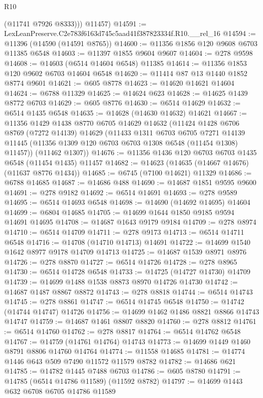 \begin{lexlean}{R10}
\begin{coremodule}
          (@11741 @7926 @8333)))
      @11457)
@14591 := LexLeanPreserve.C2e783f6163d745c5aad41f387823334f.R10.__rel_16
@14594 := @11396 (@14590 (@14591 @8765))
@14600 := @11356 @1856 @120 @9608 @6703 @11385 @6548
@14603 := @11397 @1855 @9604 @9607
@14604 := @278 @9598
@14608 := @14603 (@6514 @14604 @6548) @11385
@14614 := @11356 @1853 @120 @9602 @6703 @14604 @6548
@14620 := @11414 @87 @13 @1440 @1852 @8774 @9601
@14621 := @605 @8778
@14623 := @14620 @14621 @14604
@14624 := @6788 @11329
@14625 := @14624 @623
@14628 := @14625 @1439 @8772 @6703
@14629 := @605 @8776
@14630 := @6514 @14629
@14632 := @6514 @1435 @6548
@14635 := @14628 (@14630 @14632) @14621
@14667 := @11356
    @1429
    @1438
    @8770
    @6705
    @14629
    @14632
    (@11424
      @1428
      @6706
      @8769
      (@7272 @14139)
      @14629
      (@11433
        @1311
        @6703
        @6705
        @7271
        @14139
        @11445
        (@11356 @1309 @120 @6703 @6703 @1308 @6548 (@11454 @1308) @11457))
      (@11462 @1307))
@14676 := @11356 @1436 @120 @6703 @6703 @1435 @6548 (@11454 @1435) @11457
@14682 := @14623 (@14635 (@14667 @14676) (@11637 @8776 @1434))
@14685 := @6745 (@7100 @14621) @11329
@14686 := @6788 @14685
@14687 := @14686 @488
@14690 := @14687 @1851 @9595 @9600
@14691 := @278 @9182
@14692 := @6514 @14691
@14693 := @278 @9589
@14695 := @6514 @14693 @6548
@14698 := @14690 (@14692 @14695) @14604
@14699 := @6804 @14685
@14705 := @14699 @1644 @1850 @9185 @9594 @14691 @14695
@14708 := @14687 @1643 @9179 @9184
@14709 := @278 @8974
@14710 := @6514 @14709
@14711 := @278 @9173
@14713 := @6514 @14711 @6548
@14716 := @14708 (@14710 @14713) @14691
@14722 := @14699 @1540 @1642 @8977 @9178 @14709 @14713
@14725 := @14687 @1539 @8971 @8976
@14726 := @278 @8870
@14727 := @6514 @14726
@14728 := @278 @8965
@14730 := @6514 @14728 @6548
@14733 := @14725 (@14727 @14730) @14709
@14739 := @14699 @1488 @1538 @8873 @8970 @14726 @14730
@14742 := @14687 @1487 @8867 @8872
@14743 := @278 @8818
@14744 := @6514 @14743
@14745 := @278 @8861
@14747 := @6514 @14745 @6548
@14750 := @14742 (@14744 @14747) @14726
@14756 := @14699 @1462 @1486 @8821 @8866 @14743 @14747
@14759 := @14687 @1461 @8807 @8820
@14760 := @278 @8812
@14761 := @6514 @14760
@14762 := @278 @8817
@14764 := @6514 @14762 @6548
@14767 := @14759 (@14761 @14764) @14743
@14773 := @14699 @1449 @1460 @8791 @8806 @14760 @14764
@14774 := @11558 @14685
@14781 := @14774 @1446 @643 @509 @7490 @11572 @11579 @8782
@14782 := @14686 @621
@14785 := @14782 @1445 @7488 @6703
@14786 := @605 @8780
@14791 := @14785 (@6514 @14786 @11589) (@11592 @8782)
@14797 := @14699 @1443 @632 @6708 @6705 @14786 @11589

\end{coremodule}
\end{lexlean}
